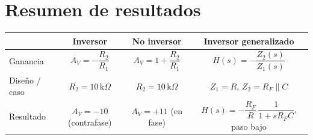 \section{Resumen de resultados}\label{sec:resumen}
\begin{center}\small
\renewcommand{\arraystretch}{1.5}
\begin{tabular}{@{}lccc@{}}
\toprule
 & Inversor & No inversor & Inversor generalizado\\
\midrule
Ganancia & $A_V=-\dfrac{R_2}{R_1}$ & $A_V=1+\dfrac{R_2}{R_1}$ & $H(s)=-\dfrac{Z_2(s)}{Z_1(s)}$\\
Diseño / caso & $R_2=10\,\mathrm{k}\Omega$ & $R_2=10\,\mathrm{k}\Omega$ & $Z_1=R$, $Z_2=R_F\parallel C$\\
Resultado & $A_V=-10$ (contrafase) & $A_V=+11$ (en fase) & $H(s)=-\dfrac{R_F}{R}\,\dfrac{1}{1+sR_FC}$, paso bajo\\
\bottomrule
\end{tabular}
\end{center}

